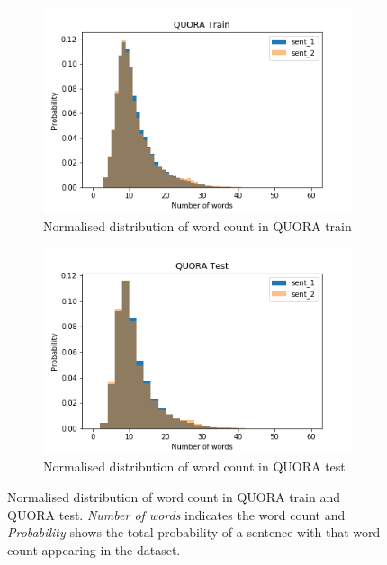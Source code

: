 \begin{enumerate}
\begin{figure}
	\captionsetup[subfigure]{justification=centering}
	\centering
	\begin{subfigure}[b]{.5\textwidth}
		\centering
		\includegraphics[width=\textwidth]{figures/semantic_textual_similarity/introduction/quora_train_words.png}
		\caption{Normalised distribution of word count in QUORA train}
		\label{fig:quora_train_words}
	\end{subfigure}%
	\begin{subfigure}[b]{.5\textwidth}
		\centering
		\includegraphics[width=\textwidth]{figures/semantic_textual_similarity/introduction/quora_test_words.png}
		\caption{Normalised distribution of word count in QUORA test}
		\label{fig:quora_test_words}
	\end{subfigure}
	\caption[Normalised distribution of word count in QUORA train and QUORA test.]{Normalised distribution of word count in QUORA train and QUORA test. \textit{Number of words} indicates the word count and \textit{Probability} shows the total probability of a sentence with that word count appearing in the dataset.}
	\label{fig:quora_words}
\end{figure}


\end{enumerate}

